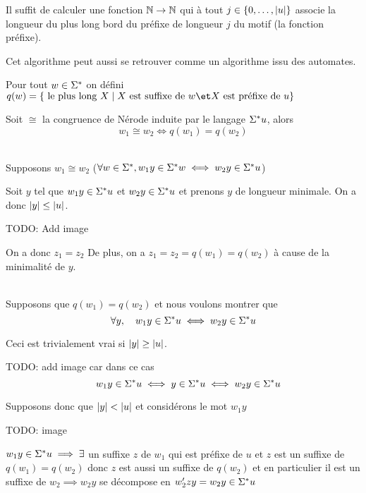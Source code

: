 Il suffit de calculer une fonction $\mathbb{N} \to \mathbb{N}$ qui à tout $j \in \left\{0,\ldots,|u|\right\}$ associe
la longueur du plus long bord du préfixe de longueur $j$ du motif (la fonction préfixe).


Cet algorithme peut aussi se retrouver comme un algorithme issu des automates.


\begin{definition}
	Pour tout $w \in \Sigma^{*}$ on défini
	$q(w) = \setdef {\text{ le plus long } X} {X \text{ est suffixe de } w \et X \text{ est préfixe de } u}$
\end{definition}

\begin{prop}
	Soit $\cong$ la congruence de Nérode induite par le langage $\Sigma^{*} u$, alors
	$$ w_1 \cong w_2 \iff q(w_1) = q(w_2)$$
\end{prop}

\begin{proofI}
	\item \bimpLR \\
	Supposons $w_1 \cong w_2$ ($\forall w \in \Sigma^{*}, w_1y \in \Sigma^{*} w \iff w_2y\in \Sigma^{*} u$)

	Soit $y$ tel que $w_1 y \in \Sigma^{*} u$ et $w_2 y \in \Sigma^{*} u$ et prenons $y$ de longueur minimale.
	On a donc $|y| \leq |u|$.

	TODO: Add image

	On a donc $z_1 = z_2$
	De plus, on a $z_1 = z_2 = q(w_1) = q(w_2)$  à cause de la minimalité de $y$.

	\item \bimpRL \\
	Supposons que $q(w_1) = q(w_2)$ et nous voulons montrer que
	$$\forall y, \quad w_1 y \in \Sigma^{*} u \iff w_2 y \in \Sigma^{*} u$$

	Ceci est trivialement vrai si $|y| \geq |u|$.

	TODO: add image
	car dans ce cas
	$$\quad w_1 y \in \Sigma^{*} u \iff  y \in \Sigma^{*} u \iff w_2 y \in \Sigma^{*} u$$

	Supposons donc que $|y| < |u|$ et considérons le mot $w_1 y$

	TODO: image

	$w_1y \in \Sigma^{*} u \implies \exists$ un suffixe $z$ de $w_1$ qui est préfixe de $u$ et $z$ est un suffixe de $q(w_1) = q(w_2)$
	donc $z$ est aussi un suffixe de $q(w_2)$ et en particulier il est un suffixe de $w_2 \implies w_2 y $ se décompose en
	$w_2'zy = w_2 y \in \Sigma^{*} u$
\end{proofI}

